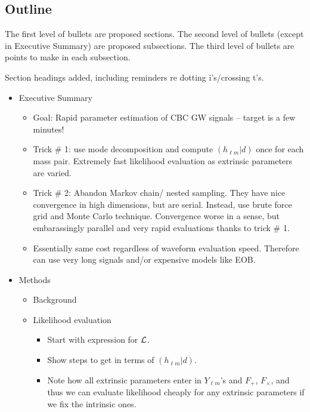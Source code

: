 \documentclass[twocolumn,prd,nofootinbib]{revtex4}
\begin{document}
\begin{widetext}
\section*{Outline}
The first level of bullets are proposed sections. 
The second level of bullets (except in Executive Summary) are proposed subsections.
The third level of bullets are points to make in each subsection.

Section headings added, including reminders re dotting i's/crossing t's.

\begin{itemize}
\item Executive Summary
	\begin{itemize}
	\item Goal: Rapid parameter estimation of CBC GW signals -- target is a few minutes!
	\item Trick \# 1: use mode decomposition and compute $( h_{\ell m} | d )$ once for each mass pair.
		Extremely fast likelihood evaluation as extrinsic parameters are varied.
	\item Trick \# 2: Abandon Markov chain/ nested sampling. They have nice convergence in high dimensions,
		but are serial. Instead, use brute force grid and Monte Carlo technique. Convergence worse in a sense,
		but embarassingly parallel and very rapid evaluations thanks to trick \# 1.
	\item Essentially same cost regardless of waveform evaluation speed. Therefore can use very long signals 
		and/or expensive models like EOB. 
	\end{itemize}

\item Methods
	\begin{itemize}
        \item Background
           
	\item Likelihood evaluation
		\begin{itemize}
		\item Start with expression for ${\cal L}$. 
		\item Show steps to get in terms of $( h_{\ell m} | d )$.
		\item Note how all extrinsic parameters enter in $Y_{\ell m}$'s and $F_+$, $F_\times$, and thus we can
			evaluate likelihood cheaply for any extrinsic parameters if we fix the intrinsic ones.
		\end{itemize}
		

\end{itemize}
\end{itemize}
\end{widetext}
\end{document}
